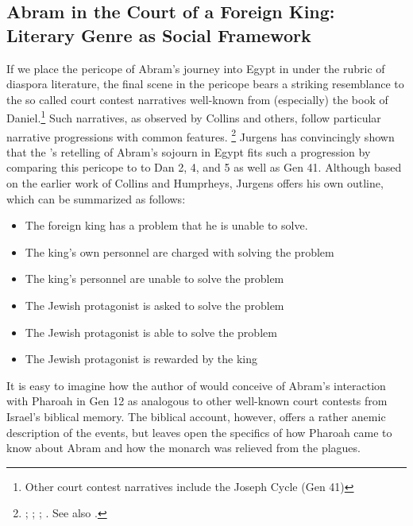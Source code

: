 \subsection{Abram in the Court of a Foreign King: Literary Genre as Social Framework}

If we place the pericope of Abram's journey into Egypt in \ga under the rubric of diaspora literature, the final scene in the pericope bears a striking resemblance to the so called court contest narratives well-known from (especially) the book of Daniel.\footnote{Other court contest narratives include the Joseph Cycle (Gen 41)} Such narratives, as observed by Collins and others, follow particular narrative progressions with common features.%
%
\footnote{\cite[TODO: pages]{collins1993}; \cite{humphreys_jbl1973}; \cite{collins_jbl1975}; \cite{wills1990}. See also \cite{niditch-doran_jbl1977}.}
%
Jurgens has convincingly shown that the \ga's retelling of Abram's sojourn in Egypt fits such a progression by comparing this pericope to to Dan 2, 4, and 5 as well as Gen 41. Although based on the earlier work of Collins and Humprheys, Jurgens offers his own outline, which can be summarized as follows\autocite[21]{jurgens_jsj2018}:

\begin{SingleSpace}
\begin{itemize}
    \item The foreign king has a problem that he is unable to solve.
    \item The king's own personnel are charged with solving the problem
    \item The king's personnel are unable to solve the problem
    \item The Jewish protagonist is asked to solve the problem
    \item The Jewish protagonist is able to solve the problem
    \item The Jewish protagonist is rewarded by the king
\end{itemize}
\end{SingleSpace}

It is easy to imagine how the author of \ga would conceive of Abram's interaction with Pharoah in Gen 12 as analogous to other well-known court contests from Israel's biblical memory. The biblical account, however, offers a rather anemic description of the events, but leaves open the specifics of how Pharoah came to know about Abram and how the monarch was relieved from the plagues. 


